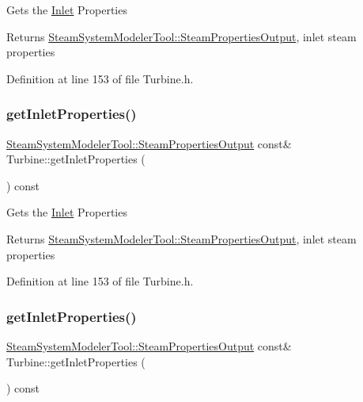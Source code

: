 Gets the \hyperlink{class_inlet}{Inlet} Properties

\begin{DoxyReturn}{Returns}
\hyperlink{struct_steam_system_modeler_tool_1_1_steam_properties_output}{Steam\+System\+Modeler\+Tool\+::\+Steam\+Properties\+Output}, inlet steam properties 
\end{DoxyReturn}


Definition at line 153 of file Turbine.\+h.

\mbox{\label{class_turbine_a7a906cf74affed9acfa4045964eccbf6}} 
\subsubsection{\texorpdfstring{get\+Inlet\+Properties()}{getInletProperties()}\hspace{0.1cm}{\footnotesize\ttfamily [2/3]}}
{\footnotesize\ttfamily \hyperlink{struct_steam_system_modeler_tool_1_1_steam_properties_output}{Steam\+System\+Modeler\+Tool\+::\+Steam\+Properties\+Output} const\& Turbine\+::get\+Inlet\+Properties (\begin{DoxyParamCaption}{ }\end{DoxyParamCaption}) const\hspace{0.3cm}{\ttfamily [inline]}}

Gets the \hyperlink{class_inlet}{Inlet} Properties

\begin{DoxyReturn}{Returns}
\hyperlink{struct_steam_system_modeler_tool_1_1_steam_properties_output}{Steam\+System\+Modeler\+Tool\+::\+Steam\+Properties\+Output}, inlet steam properties 
\end{DoxyReturn}


Definition at line 153 of file Turbine.\+h.

\mbox{\label{class_turbine_a7a906cf74affed9acfa4045964eccbf6}} 
\subsubsection{\texorpdfstring{get\+Inlet\+Properties()}{getInletProperties()}\hspace{0.1cm}{\footnotesize\ttfamily [3/3]}}
{\footnotesize\ttfamily \hyperlink{struct_steam_system_modeler_tool_1_1_steam_properties_output}{Steam\+System\+Modeler\+Tool\+::\+Steam\+Properties\+Output} const\& Turbine\+::get\+Inlet\+Properties (\begin{DoxyParamCaption}{ }\end{DoxyParamCaption}) const\hspace{0.3cm}{\ttfamily [inline]}}

